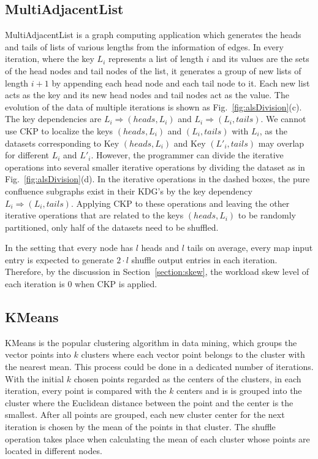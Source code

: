 \documentclass[10pt,journal,compsoc]{IEEEtran}
\begin{document}
\subsection{MultiAdjacentList}
MultiAdjacentList \cite{multiAdjList} is
a graph computing application which generates the heads and tails of
lists of various lengths from the information of edges.
In every iteration, where the key $L_i$ represents a list of length $i$ and its values are the sets of the head nodes and tail nodes of the list, it
generates a group of new lists of length $i+1$ by appending each head
node and each tail node to it. Each new list acts as the key and
its new head nodes and tail nodes act as the value.
The evolution of the data of multiple iterations is shown as Fig.~\ref{fig:alsDivision}(c).
The key dependencies are $L_i \Rightarrow (heads, L_i)$ and $L_i \Rightarrow (L_i, tails)$. 
We cannot use CKP to localize the keys $(heads, L_i)$ and $(L_i, tails)$ with $L_i$, 
as the datasets corresponding to Key $(heads, L_i)$ and Key $(L'_i, tails)$ may overlap for different $L_i$ and $L'_i$.
However, the programmer can divide the iterative operations into several smaller iterative operations by dividing the dataset as in Fig.~\ref{fig:alsDivision}(d). 
In the iterative operations in the dashed boxes, the pure confluence subgraphs exist 
in their KDG's by the key dependency $L_i \Rightarrow (L_i, tails)$.
Applying CKP to these operations and leaving the other iterative operations
that are related to the keys $(heads, L_i)$ to be randomly partitioned,
only half of the datasets need to be shuffled. 

In the setting that every node has $l$ heads and $l$ tails on average, every map input entry is expected to generate $2 \cdot l$ shuffle output entries in each iteration. Therefore, by the discussion in Section~\ref{section:skew}, the workload skew level of each iteration is 0 when CKP is applied. 

\subsection{KMeans}
KMeans \cite{kmeans} is the popular clustering algorithm in data mining, which groups the vector points into $k$ clusters where each vector point belongs to the cluster with the nearest mean. 
This process could be done in a dedicated number of iterations. 
With the initial $k$ chosen points regarded as the centers of the clusters, 
in each iteration, every point is compared with the $k$ centers and is is grouped into the cluster where the Euclidean distance between the point and the center is the smallest. 
After all points are grouped, each new cluster center for the next iteration is chosen by the mean of the points in that cluster. 
The shuffle operation takes place when calculating the mean of each cluster whose points are located in different nodes. 
\end{document}
